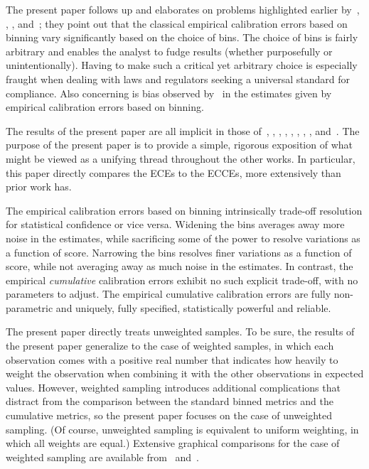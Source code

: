 \documentclass{article}
\begin{document}
The present paper follows up and elaborates on problems highlighted earlier
by~\cite{gupta-rahimi-ajanthan-mensink-sminchisescu-hartley},
\cite{roelofs-cain-shlens-mozer}, \cite{tygert_full}, and~\cite{tygert_two};
they point out that the classical empirical calibration errors
based on binning vary significantly based on the choice of bins.
The choice of bins is fairly arbitrary and enables the analyst to fudge results
(whether purposefully or unintentionally).
Having to make such a critical yet arbitrary choice is especially fraught
when dealing with laws and regulators seeking a universal standard
for compliance.
Also concerning is bias observed by~\cite{roelofs-cain-shlens-mozer}
in the estimates given by empirical calibration errors based on binning.

The results of the present paper are all implicit in those
of~\cite{brocker}, \cite{gupta-rahimi-ajanthan-mensink-sminchisescu-hartley},
\cite{kumar-liang-ma}, \cite{nixon-dusenberry-zhang-jerfel-tran}, 
\cite{roelofs-cain-shlens-mozer}, \cite{simonoff-udina}, \cite{srihera-stute},
\cite{stute}, and~\cite{vaicenavicius-widmann-andersson-lindsten-roll-schoen}.
The purpose of the present paper is to provide a simple, rigorous exposition
of what might be viewed as a unifying thread throughout the other works.
In particular, this paper directly compares the ECEs to the ECCEs,
more extensively than prior work has.

The empirical calibration errors based on binning intrinsically
trade-off resolution for statistical confidence or vice versa.
Widening the bins averages away more noise in the estimates, while sacrificing
some of the power to resolve variations as a function of score.
Narrowing the bins resolves finer variations as a function of score,
while not averaging away as much noise in the estimates.
In contrast, the empirical {\it cumulative} calibration errors exhibit
no such explicit trade-off, with no parameters to adjust.
The empirical cumulative calibration errors are fully non-parametric
and uniquely, fully specified, statistically powerful and reliable.

The present paper directly treats unweighted samples.
To be sure, the results of the present paper generalize to the case
of weighted samples, in which each observation comes
with a positive real number that indicates how heavily
to weight the observation when combining it with the other observations
in expected values.
However, weighted sampling introduces additional complications that distract
from the comparison between the standard binned metrics
and the cumulative metrics, so the present paper focuses
on the case of unweighted sampling.
(Of course, unweighted sampling is equivalent to uniform weighting,
in which all weights are equal.)
Extensive graphical comparisons for the case of weighted sampling
are available from~\cite{tygert_full} and~\cite{tygert_two}.
\end{document}
